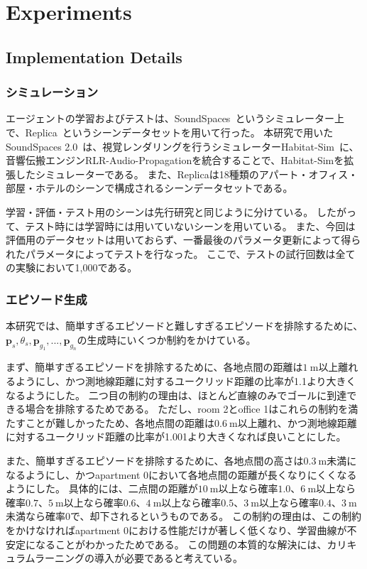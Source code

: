 \section{Experiments}

\subsection{Implementation Details}

\subsubsection{シミュレーション}
エージェントの学習およびテストは、SoundSpaces~\cite{chen2020soundspaces, chen2022soundspaces}というシミュレーター上で、Replica~\cite{straub2019replica}というシーンデータセットを用いて行った。
本研究で用いたSoundSpaces 2.0~\cite{chen2022soundspaces}は、視覚レンダリングを行うシミュレーターHabitat-Sim~\cite{savva2019habitat}に、音響伝搬エンジンRLR-Audio-Propagationを統合することで、Habitat-Simを拡張したシミュレーターである。
また、Replicaは18種類のアパート・オフィス・部屋・ホテルのシーンで構成されるシーンデータセットである。

学習・評価・テスト用のシーンは先行研究\cite{chen2020soundspaces}と同じように分けている。
したがって、テスト時には学習時には用いていないシーンを用いている。
また、今回は評価用のデータセットは用いておらず、一番最後のパラメータ更新によって得られたパラメータによってテストを行なった。
ここで、テストの試行回数は全ての実験において1,000である。



\subsubsection{エピソード生成}

本研究では、簡単すぎるエピソードと難しすぎるエピソードを排除するために、$\boldsymbol{p}_s, \theta_s, \boldsymbol{p}_{g_1}, ..., \boldsymbol{p}_{g_n}$の生成時にいくつか制約をかけている。

まず、簡単すぎるエピソードを排除するために、各地点間の距離は$1\ \mathrm{m}$以上離れるようにし、かつ測地線距離に対するユークリッド距離の比率が1.1より大きくなるようにした。
二つ目の制約の理由は、ほとんど直線のみでゴールに到達できる場合を排除するためである。
ただし、room 2とoffice 1はこれらの制約を満たすことが難しかったため、各地点間の距離は$0.6\ \mathrm{m}$以上離れ、かつ測地線距離に対するユークリッド距離の比率が1.001より大きくなれば良いことにした。

また、簡単すぎるエピソードを排除するために、各地点間の高さは$0.3\ \mathrm{m}$未満になるようにし、かつapartment 0において各地点間の距離が長くなりにくくなるようにした。
具体的には、二点間の距離が$10\ \mathrm{m}$以上なら確率$1.0$、$6\ \mathrm{m}$以上なら確率$0.7$、$5\ \mathrm{m}$以上なら確率$0.6$、$4\ \mathrm{m}$以上なら確率$0.5$、$3\ \mathrm{m}$以上なら確率$0.4$、$3\ \mathrm{m}$未満なら確率$0$で、却下されるというものである。
この制約の理由は、この制約をかけなければapartment 0における性能だけが著しく低くなり、学習曲線が不安定になることがわかったためである。
この問題の本質的な解決には、カリキュラムラーニングの導入が必要であると考えている。


